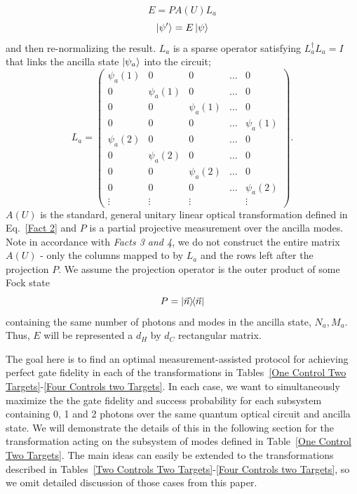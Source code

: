 \documentclass[aps,pra,twocolumn,showpacs,superscriptaddress,floatfix,10pt]{revtex4}
\begin{document}
\begin{equation}
\label{Kraus Paula Operator}
E = P A(U) L_a
\end{equation} 
\begin{equation}
\ket{\psi^\prime} = E \ket{\psi}
\end{equation}
and then re-normalizing the result.  $L_a$ is a sparse operator satisfying $L_a^\dagger L_a = I$ that links the ancilla state $\ket{\psi_a}$ into the circuit;
\begin{equation}
\label{Ancilla Linker}
L_a = \begin{pmatrix} \psi_a(1) & 0 & 0 & \dots & 0 \\
0 & \psi_a(1) & 0 & \dots & 0 \\
0 & 0 & \psi_a(1) & \dots & 0 \\
0 & 0 & 0 & \dots & \psi_a(1) \\
\psi_a(2) & 0 & 0 & \dots & 0 \\
0 & \psi_a(2) & 0 & \dots & 0 \\
0 & 0 & \psi_a(2) & \dots & 0 \\
0 & 0 & 0 & \dots & \psi_a(2) \\
\vdots & \vdots & \vdots & & \vdots \end{pmatrix} .
\end{equation}
$A(U)$ is the standard, general unitary linear optical transformation defined in Eq.~\ref{Fact 2} and $P$ is a partial projective measurement over the ancilla modes. Note in accordance with \textit{Facts 3 and 4}, we do not construct the entire matrix $A(U)$ - only the columns mapped to by $L_a$ and the rows left after the projection $P$. We assume the projection operator is the outer product of some Fock state
\begin{equation}
P = \outerproduct{\vec{n}}{\vec{n}}
\end{equation}
containing the same number of photons and modes in the ancilla state, $N_a,M_a$. Thus, $E$ will be represented a $d_H$ by $d_C$ rectangular matrix. 

The goal here is to find an optimal measurement-assisted protocol for achieving perfect gate fidelity in each of the transformations in Tables~\ref{One Control Two Targets}-\ref{Four Controls two Targets}. In each case, we want to simultaneously maximize the the gate fidelity and success probability for each subsystem containing 0, 1 and 2 photons over the same quantum optical circuit and ancilla state. We will demonstrate the details of this in the following section for the transformation acting on the subsystem of modes defined in Table~\ref{One Control Two Targets}. The main ideas can easily be extended to the transformations described in Tables~\ref{Two Controls Two Targets}-\ref{Four Controls two Targets}, so we omit detailed discussion of those cases from this paper.
\end{document}
